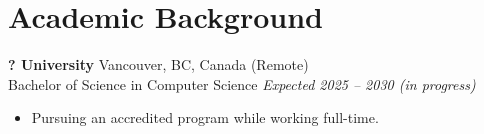 \documentclass[a4paper,10pt]{article}
\begin{document}
\section*{Academic Background}

\textbf{? University} 
    \hfill Vancouver, BC, Canada (Remote)
    \\Bachelor of Science in Computer Science
    \hfill \textit{Expected 2025 – 2030 (in progress)}
\begin{itemize}
    \item Pursuing an accredited program while working full-time.
\end{itemize}
\end{document}
